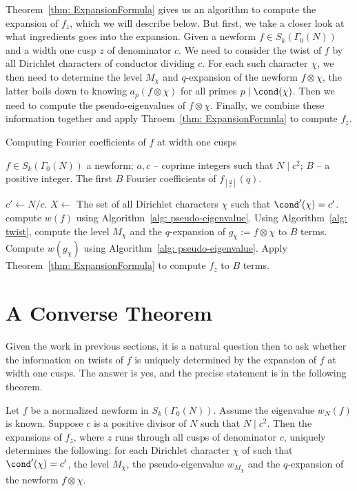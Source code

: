 \documentclass [11pt, proquest] {uwthesis}[2015/03/03]
\begin{document}
Theorem~\ref{thm: ExpansionFormula} gives us an algorithm to compute the expansion of $f_z$, which we will describe below. But first, we take a closer look at what ingredients goes into the expansion. Given a newform $f \in S_k(\Gamma_0(N))$ and a width one cusp $z$ of denominator $c$. We need to consider the twist of $f$ by all Dirichlet characters of conductor dividing $c$. 
For each such character $\chi$, we then need to determine the level $M_\chi$ and $q$-expansion of the newform $f \otimes \chi$, the latter boils down to knowing $a_p(f \otimes \chi)$ for all primes $p \mid \cond(\chi)$. Then we need to compute the pseudo-eigenvalues of $f \otimes \chi$. Finally, we combine these information together and apply Throem~\ref{thm: ExpansionFormula} to compute $f_z$. 

\begin{algorithm}[H]
\caption{Computing Fourier coefficients of $f$ at width one cusps}
\label{alg: qexp}
\begin{algorithmic}[1]
    \Require $f \in S_k(\Gamma_0(N))$ a newform; $a, c$ -- coprime integers such that $N \mid c^2$; $B$ -- a positive integer. 
    \Ensure The first $B$ Fourier coefficients of $f_{\left[\frac{a}{c} \right]}(q)$. 
    
    \State  $c' \gets N/c$. $X \gets$ The set of all Dirichlet characters $\chi$ such that $\cond'(\chi) = c'$. 
    \State compute $w(f)$  using Algorithm~\ref{alg: pseudo-eigenvalue}. 
    	\State Using  Algorithm~\ref{alg: twist}, compute the level $M_\chi$ and the $q$-expansion of $g_\chi := f \otimes \chi$ to $B$ terms.
	\State Compute $w(g_\chi)$ using Algorithm~\ref{alg: pseudo-eigenvalue}.
    \EndFor
    \State Apply Theorem~\ref{thm: ExpansionFormula} to compute $f_z$ to $B$ terms. 
    \end{algorithmic}
\end{algorithm}

\section{A Converse Theorem}

Given the work in previous sections, it is a natural question then to ask whether the information on twists of $f$ is uniquely determined by the expansion of $f$ at width one cusps. The answer is yes, and the precise statement is in the following theorem. 

\begin{theorem}
Let $f$ be a normalized newform in $S_k(\Gamma_0(N))$. Assume the eigenvalue $w_N(f)$ is known. Suppose $c$ is a positive divisor of $N$ such that $N \mid c^2$.  Then the expansions of $f_z$, where $z$ runs through all cusps of denominator $c$, uniquely determines the following: for each Dirichlet character 
$\chi$ of such that $\cond'(\chi) = c'$, the level $M_\chi$, the pseudo-eigenvalue $w_{M_\chi}$ and the $q$-expansion of the newform $f \otimes \chi$. 
\end{theorem}
\end{document}
